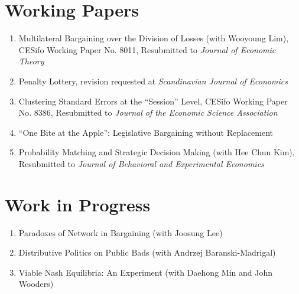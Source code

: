 \documentclass[margin, a4paper]{res}
\begin{document}
\begin{resume}
\section{Working Papers}
\begin{enumerate}[leftmargin=*]
\item Multilateral Bargaining over the Division of Losses (with Wooyoung Lim), CESifo Working Paper No. 8011, Resubmitted to \emph{Journal of Economic Theory}
\item Penalty Lottery, revision requested at \emph{Scandinavian Journal of Economics}
\item Clustering Standard Errors at the ``Session'' Level, CESifo Working Paper No. 8386, Resubmitted to \emph{Journal of the Economic Science Association}
\item ``One Bite at the Apple'': Legislative Bargaining without Replacement
\item Probability Matching and Strategic Decision Making (with Hee Chun Kim), Resubmitted to \emph{Journal of Behavioral and Experimental Economics}
\end{enumerate}

\section{Work in Progress}
\begin{enumerate}[leftmargin=*]
\item Paradoxes of Network in Bargaining (with Joosung Lee)
\item Distributive Politics on Public Bads (with Andrzej Baranski-Madrigal)
\item Viable Nash Equilibria: An Experiment (with Daehong Min and John Wooders)
\end{enumerate}


\end{resume}
\end{document}
